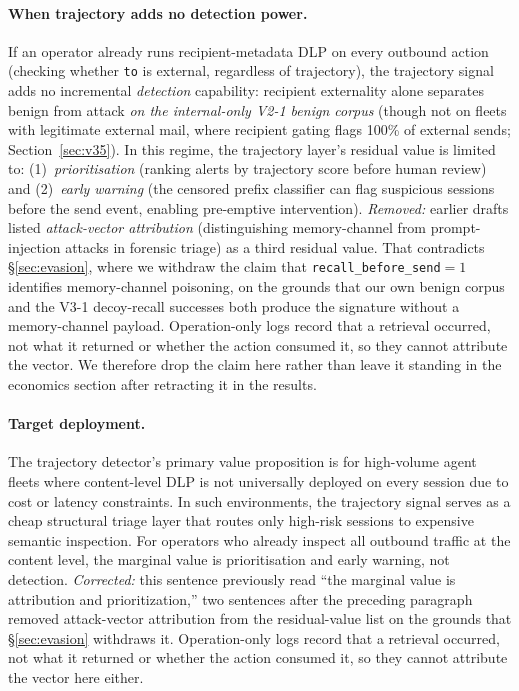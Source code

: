 \documentclass{article}
\begin{document}
\paragraph{When trajectory adds no detection power.} If an operator already runs recipient-metadata DLP on every outbound action (checking whether \texttt{to} is external, regardless of trajectory), the trajectory signal adds no incremental \emph{detection} capability: recipient externality alone separates benign from attack \emph{on the internal-only V2-1 benign corpus} (though not on fleets with legitimate external mail, where recipient gating flags 100\% of external sends; Section~\ref{sec:v35}). In this regime, the trajectory layer's residual value is limited to: (1)~\emph{prioritisation} (ranking alerts by trajectory score before human review) and (2)~\emph{early warning} (the censored prefix classifier can flag suspicious sessions before the send event, enabling pre-emptive intervention). \emph{Removed:} earlier drafts listed \emph{attack-vector attribution} (distinguishing memory-channel from prompt-injection attacks in forensic triage) as a third residual value. That contradicts \S\ref{sec:evasion}, where we withdraw the claim that \texttt{recall\_before\_send}${=}1$ identifies memory-channel poisoning, on the grounds that our own benign corpus and the V3-1 decoy-recall successes both produce the signature without a memory-channel payload. Operation-only logs record that a retrieval occurred, not what it returned or whether the action consumed it, so they cannot attribute the vector. We therefore drop the claim here rather than leave it standing in the economics section after retracting it in the results.

\paragraph{Target deployment.} The trajectory detector's primary value proposition is for high-volume agent fleets where content-level DLP is not universally deployed on every session due to cost or latency constraints. In such environments, the trajectory signal serves as a cheap structural triage layer that routes only high-risk sessions to expensive semantic inspection. For operators who already inspect all outbound traffic at the content level, the marginal value is prioritisation and early warning, not detection. \emph{Corrected:} this sentence previously read ``the marginal value is attribution and prioritization,'' two sentences after the preceding paragraph removed attack-vector attribution from the residual-value list on the grounds that \S\ref{sec:evasion} withdraws it. Operation-only logs record that a retrieval occurred, not what it returned or whether the action consumed it, so they cannot attribute the vector here either.
\end{document}
